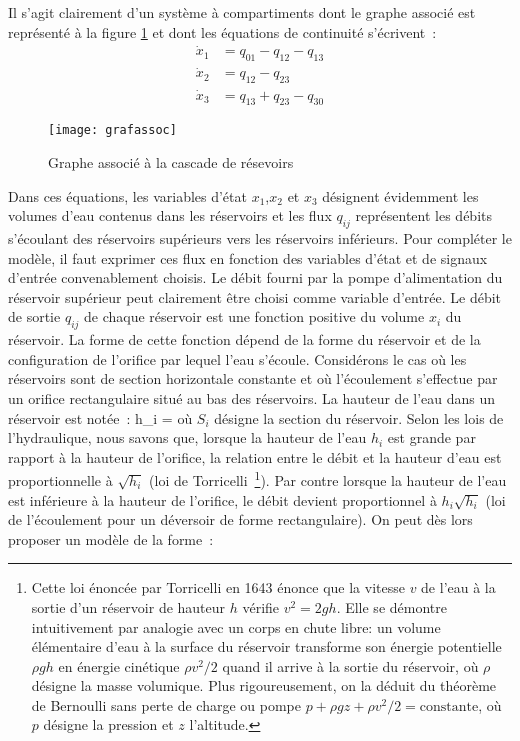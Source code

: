 \begin{exemple}
Il s'agit clairement d'un système à compartiments dont le graphe associé
est représenté à la figure \ref{Fig:grafassoc} et dont les équations de 
continuité s'écrivent~:
\begin{equation*} \begin{split} 
\dot x_1 &= q_{01} - q_{12} - q_{13} \\
\dot x_2 &=  q_{12} - q_{23} \\
\dot x_3 &= q_{13} + q_{23} - q_{30} 
\end{split} \end{equation*}
\begin{figure}[h] 
\begin{center}
\texttt{[image: grafassoc]}
\caption{Graphe associé à la cascade de résevoirs}
\label{Fig:grafassoc}
\end{center} 
\end{figure}
Dans ces équations, les variables d'état $x_1$,$ x_2$ et $x_3$ désignent 
évidemment les volumes d'eau contenus dans les réservoirs et les flux 
$q_{ij}$ représentent les débits s'écoulant des réservoirs supérieurs
vers les réservoirs inférieurs. Pour compléter le modèle, il faut 
exprimer ces flux en fonction des variables d'état et de signaux d'entrée
convenablement choisis.
Le débit fourni par la
pompe d'alimentation du réservoir supérieur peut clairement être choisi
comme variable d'entrée. Le débit de sortie $q_{ij}$
de chaque réservoir est une fonction positive du volume $x_i$ du réservoir. La forme de cette fonction dépend de la forme du réservoir et de la configuration de l'orifice par lequel l'eau s'écoule. Considérons le cas où les réservoirs sont de section horizontale constante et où l'écoulement s'effectue par un orifice rectangulaire situé au bas des réservoirs. La hauteur de l'eau dans un réservoir est notée~:
\eqnn
h_i = 
\eeqnn
où $S_{i}$ désigne la section du réservoir.
Selon les lois de l'hydraulique, nous savons que, lorsque la hauteur de l'eau $h_i$ est grande par rapport à la hauteur de l'orifice, la relation entre le débit et la hauteur d'eau est proportionnelle à $\sqrt{h_i}$ (loi de Torricelli~\footnote{Cette loi énoncée par Torricelli en 1643 énonce que la vitesse $v$ de l'eau à la sortie d'un réservoir de hauteur $h$ vérifie $v^2=2gh$. Elle se démontre intuitivement par analogie avec un corps en chute libre: un volume élémentaire d'eau à la surface du réservoir transforme son énergie potentielle $\rho g h$ en énergie cinétique $\rho v^2/2$ quand il arrive à la sortie du réservoir, où $\rho$ désigne la masse volumique. Plus rigoureusement, on la déduit du théorème de Bernoulli sans perte de charge ou pompe $p+\rho gz +\rho v^2/2 = \mathrm{constante}$, où $p$ désigne la pression et $z$ l'altitude.}). Par contre lorsque la hauteur de l'eau est inférieure à la hauteur de l'orifice, le débit devient proportionnel à $h_i\sqrt{h_i}$ (loi de l'écoulement pour un déversoir de forme rectangulaire). On peut dès lors proposer un modèle de la forme~:

\end{exemple}
